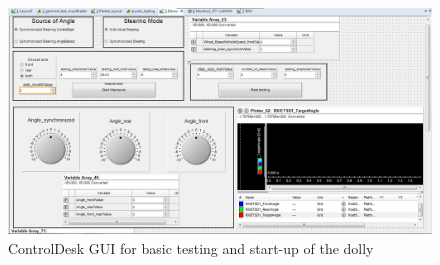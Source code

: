 \documentclass[ExampleMasters.tex]{subfiles}
\begin{document}
\begin{figure}[h]
	\centering
	\includegraphics[width=1\linewidth]{figures/CD_Layout}
	\caption{ControlDesk GUI for basic testing and start-up of the dolly}	
	\label{fig:control_desk_GUI}
\end{figure}
\end{document}
